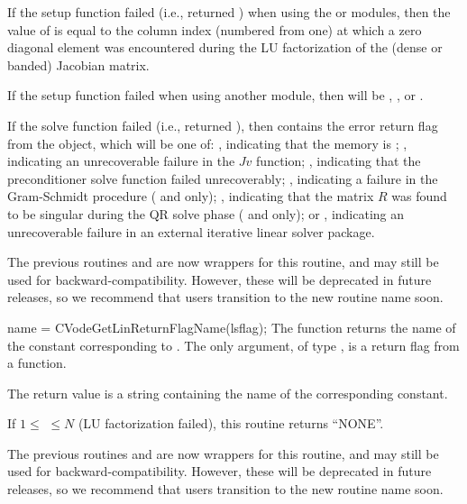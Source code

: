 {
  If the {\cvls} setup function failed (i.e.,  returned
  ) when using the {\sunlinsoldense} or
  {\sunlinsolband} modules, then the value of  is equal to
  the column index (numbered from one) at which a zero diagonal
  element was encountered during the LU factorization of the (dense or
  banded) Jacobian matrix.

  If the {\cvls} setup function failed when using another {\sunlinsol}
  module, then  will be ,
  , or .

  If the {\cvls} solve function failed (i.e.,  returned
  ), then  contains the error return
  flag from the {\sunlinsol} object, which will be one of:
  , indicating that the {\sunlinsol} memory is ;
  , indicating an unrecoverable failure in the
  $Jv$ function;
  , indicating that the preconditioner solve
  function  failed unrecoverably;
  , indicating a failure in the Gram-Schmidt
  procedure ({\spgmr} and {\spfgmr} only);
  , indicating that the matrix $R$ was found to be
  singular during the QR solve phase ({\spgmr} and {\spfgmr} only); or
  , indicating an unrecoverable
  failure in an external iterative linear solver package.

  The previous routines  and
   are now wrappers for this routine, and may
  still be used for backward-compatibility.  However, these will be
  deprecated in future releases, so we recommend that users transition
  to the new routine name soon.
}
{
  name = CVodeGetLinReturnFlagName(lsflag);
}
{
  The function  returns the
  name of the {\cvls} constant corresponding to .
}
{
  The only argument, of type , is a return flag from a {\cvls}
  function.
}
{
  The return value is a string containing the name of the corresponding constant.

  If $1 \leq $  $ \leq N$ (LU factorization failed), this routine
  returns ``NONE''.
}
{
  The previous routines  and
   are now wrappers for this routine, and may
  still be used for backward-compatibility.  However, these will be
  deprecated in future releases, so we recommend that users transition
  to the new routine name soon.
}




